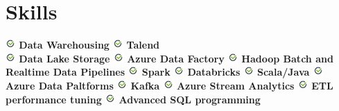 \documentclass[]{deedy-resume-openfont}
\begin{document}
\begin{minipage}[t]{0.37\textwidth} 

    
\section{Skills} 

\textbf{
\includegraphics{images/bullet1.png} Data Warehousing
\includegraphics{images/bullet1.png} Talend \\
\includegraphics{images/bullet1.png} Data Lake Storage
\includegraphics{images/bullet1.png} Azure Data Factory
\includegraphics{images/bullet1.png} Hadoop Batch and Realtime Data Pipelines
\includegraphics{images/bullet1.png} Spark
\includegraphics{images/bullet1.png} Databricks
\includegraphics{images/bullet1.png} Scala/Java
\includegraphics{images/bullet1.png} Azure Data Paltforms
\includegraphics{images/bullet1.png} Kafka
\includegraphics{images/bullet1.png} Azure Stream Analytics
\includegraphics{images/bullet1.png} ETL performance tuning
\includegraphics{images/bullet1.png} Advanced SQL programming
}
\end{minipage}
\end{document}

